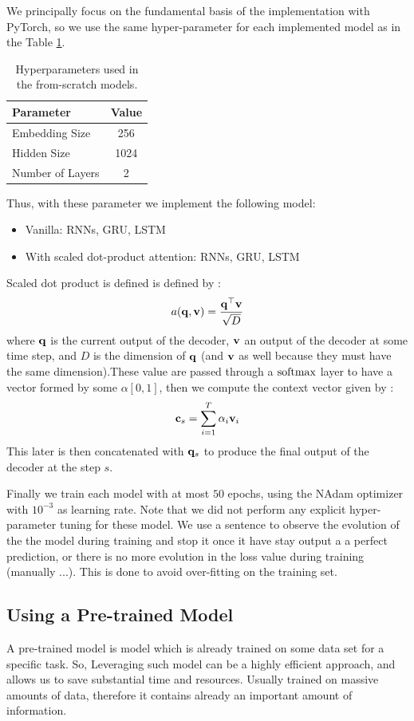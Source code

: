 We principally focus on the fundamental basis of the implementation with PyTorch, so we use the same hyper-parameter for each implemented model as in the Table \ref{tab:hyper}.
\begin{table}[H]
    \centering
    \begin{tabular}{lc}
        \toprule
 Parameter & Value \\
        \midrule
 Embedding Size & 256 \\
 Hidden Size & 1024 \\
 Number of Layers & 2 \\
        \bottomrule
    \end{tabular}
    \caption{Hyperparameters used in the from-scratch models.}
    \label{tab:hyper}
\end{table}
Thus, with these parameter we implement the following model:
\begin{itemize}
	\item Vanilla: RNNs, GRU, LSTM
	\item With scaled dot-product attention:  RNNs, GRU, LSTM
\end{itemize}
Scaled dot product is defined is defined by :
\begin{equation}
	a(\mathbf{q, v}) = \frac{\mathbf{q^\top v}}{\sqrt{D}}
\end{equation}
where $\mathbf{q}$ is the current output of the decoder, $\mathbf{v}$ an output of the decoder at some time step, and  $D$ is the dimension of $\mathbf{q}$ (and $\mathbf{v}$ as well because they must have the same dimension).These value are passed through a $\mathrm{softmax}$ layer to have a vector formed by some $\alpha[0,1]$, then we compute the context vector given by :
\begin{equation}
	\mathbf{c}_s = \sum_{i=1}^{T}\alpha_i \mathbf{v}_i
\end{equation}
This later is then concatenated with $\mathbf{q}_s$ to produce the final output of the decoder at the step $s$.

Finally we train each model with at most $50$ epochs, using the NAdam optimizer with $10^{-3}$ as learning rate. Note that we did not perform any explicit hyper-parameter tuning for these model. We use a sentence to observe the evolution of the the model during training and stop it once it have stay output a a perfect prediction, or there is no more evolution in the loss value during training (manually ...). This is done to avoid over-fitting on the training set.

\subsection{Using a Pre-trained Model}
A pre-trained model is model which is already trained on some data set for a specific task. So, Leveraging such model can be a highly efficient approach, and allows us to save substantial time and resources. Usually trained on massive amounts of data, therefore it contains already an important amount of information.

